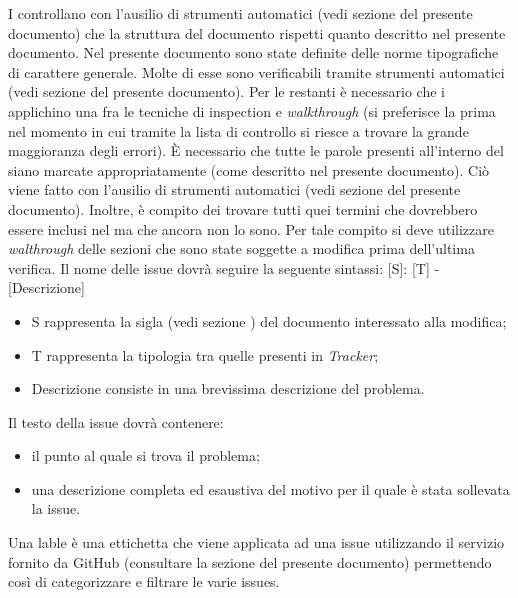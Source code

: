 				I  controllano con l'ausilio di strumenti automatici (vedi sezione  del presente 
				documento) che la struttura del documento rispetti quanto descritto nel presente documento.
				Nel presente documento sono state definite delle norme tipografiche di carattere generale. Molte di esse sono verificabili tramite 
				strumenti automatici (vedi sezione  del presente documento). Per le restanti è necessario che i 
				 applichino una fra le tecniche di inspection e \textit{walkthrough}	(si preferisce la prima nel momento in cui 
				tramite la lista di controllo si riesce a trovare la grande maggioranza degli errori).
				È necessario che tutte le parole presenti all'interno del  siano marcate appropriatamente (come descritto nel presente 
				documento). Ciò viene fatto con l'ausilio di strumenti automatici (vedi sezione  del presente documento). 
				Inoltre, è compito dei  trovare tutti quei termini che dovrebbero essere inclusi nel  ma che 
				ancora non lo sono. Per tale compito si deve utilizzare \textit{walthrough} delle sezioni che sono state soggette a modifica prima 
				dell'ultima verifica.
		\label{sec:sintassiissue}
			Il nome delle issue dovrà seguire la seguente sintassi: [S]: [T] - [Descrizione]
			\begin{itemize}
				\item S rappresenta la sigla (vedi sezione ) del documento interessato alla modifica;
				\item T rappresenta la tipologia tra quelle presenti in \textit{Tracker};
				\item Descrizione consiste in una brevissima descrizione del problema.
			\end{itemize}
			Il testo della issue dovrà contenere:
			\begin{itemize}
				\item il punto al quale si trova il problema;
				\item una descrizione completa ed esaustiva del motivo per il quale è stata sollevata la issue.
			\end{itemize}
	        Una lable è una ettichetta che viene applicata ad una issue utilizzando il servizio fornito da GitHub (consultare la sezione  del presente documento) permettendo così di categorizzare e filtrare le varie issues.\\

